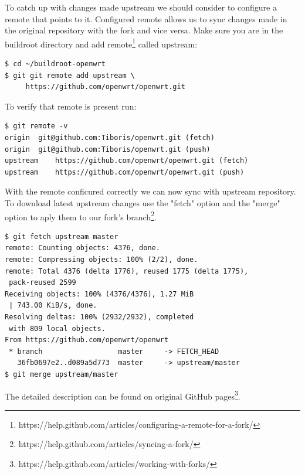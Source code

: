 To catch up with changes made upstream we should consider to configure a remote that points to it.
Configured remote allows us to sync changes made in the original repository with the fork and vice versa.
Make sure you are in the buildroot directory and add remote\footnote{https://help.github.com/articles/configuring-a-remote-for-a-fork/} called upstream:
\begin{lstlisting}[columns=fixed,basicstyle=\ttfamily\footnotesize,tabsize=4,backgroundcolor=\color{yellow!10}]
$ cd ~/buildroot-openwrt
$ git git remote add upstream \
     https://github.com/openwrt/openwrt.git
\end{lstlisting}
To verify that remote is present run:
\begin{lstlisting}[columns=fixed,basicstyle=\ttfamily\footnotesize,tabsize=4,backgroundcolor=\color{yellow!10}]
$ git remote -v
origin	git@github.com:Tiboris/openwrt.git (fetch)
origin	git@github.com:Tiboris/openwrt.git (push)
upstream	https://github.com/openwrt/openwrt.git (fetch)
upstream	https://github.com/openwrt/openwrt.git (push)
\end{lstlisting}
With the remote conficured correctly we can now sync with
 upstream repository.
To download latest upstream changes use the "fetch" option
 and  the "merge" option to aply them to our fork's branch\footnote{https://help.github.com/articles/syncing-a-fork/}.
\begin{lstlisting}[columns=fixed,basicstyle=\ttfamily\footnotesize,tabsize=4,backgroundcolor=\color{yellow!10}]
$ git fetch upstream master
remote: Counting objects: 4376, done.
remote: Compressing objects: 100% (2/2), done.
remote: Total 4376 (delta 1776), reused 1775 (delta 1775),
 pack-reused 2599
Receiving objects: 100% (4376/4376), 1.27 MiB
 | 743.00 KiB/s, done.
Resolving deltas: 100% (2932/2932), completed
 with 809 local objects.
From https://github.com/openwrt/openwrt
 * branch                  master     -> FETCH_HEAD
   36fb0697e2..d089a5d773  master     -> upstream/master
$ git merge upstream/master
\end{lstlisting}
The detailed description can be found on original GitHub pages\footnote{https://help.github.com/articles/working-with-forks/}.
